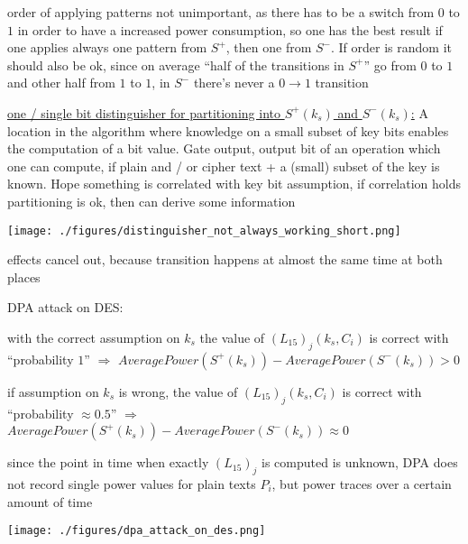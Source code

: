\documentclass[landscape, a4paper]{article}
\begin{document}
\begin{minipage}[t]{0.2\linewidth}
\begin{betterlist}
\begin{betterlist}
			\item order of applying patterns not unimportant, as there has to be a switch from $0$ to $1$ in order to have a increased power consumption, so one has the best result if one applies always one pattern from $S^+$, then one from $S^-$. If order is random it should also be ok, since on average \enquote{half of the transitions in $S^+$} go from $0$ to $1$ and other half from $1$ to $1$, in $S^-$ there's never a $0\rightarrow 1$ transition
			\item \underline{\alert{one / single bit distinguisher} for partitioning into $S^+(k_s)$ and $S^−(k_s)$:} A location in the algorithm where knowledge on a small subset of key bits enables the computation of a bit value. Gate output, output bit of an operation which one can compute, if plain and / or cipher text + a (small) subset of the key is known. Hope something is correlated with key bit assumption, if correlation holds partitioning is ok, then can derive some information

			\texttt{[image: ./figures/distinguisher\_not\_always\_working\_short.png]}
			\begin{betterlist}
				\item effects cancel out, because transition happens at almost the same time at both places
			\end{betterlist}
			\item \alert{DPA attack on DES:}
			\begin{betterlist}
				\item with the correct assumption on $k_s$ the value of $(L_{15})_j (k_s, C_i)$ is correct with \enquote{probability $1$} $\Rightarrow$ $AveragePower(S^+(k_s)) - AveragePower(S^−(k_s)) > 0$
				\item if assumption on $k_s$ is wrong, the value of $(L_{15})_j (k_s, C_i)$ is correct with \enquote{probability $\approx 0.5$} $\Rightarrow$ $AveragePower(S^+(k_s)) - AveragePower(S^−(k_s)) \approx 0$
				\item since the point in time when exactly $(L_{15})_j$ is computed is unknown, DPA does not record \alert{single power values} for plain texts $P_i$, but \alert{power traces} over a certain amount of time
			\end{betterlist}
			\texttt{[image: ./figures/dpa\_attack\_on\_des.png]}


\end{betterlist}
\end{betterlist}
\end{minipage}
\end{document}
